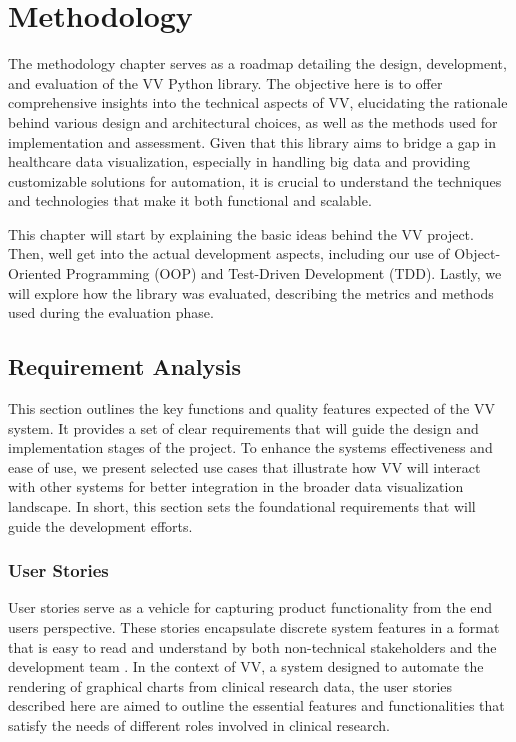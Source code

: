 \chapter{Methodology}\label{methodology}

\minitoc

The methodology chapter serves as a roadmap detailing the design,
development, and evaluation of the VV Python library. The objective here
is to offer comprehensive insights into the technical aspects of VV,
elucidating the rationale behind various design and architectural
choices, as well as the methods used for implementation and assessment.
Given that this library aims to bridge a gap in healthcare data
visualization, especially in handling big data and providing
customizable solutions for automation, it is crucial to understand the
techniques and technologies that make it both functional and scalable.

This chapter will start by explaining the basic ideas behind the VV
project. Then, we\textquotesingle ll get into the actual development
aspects, including our use of Object-Oriented Programming (OOP) and
Test-Driven Development (TDD). Lastly, we will explore how the library
was evaluated, describing the metrics and methods used during the
evaluation phase.

\section{Requirement Analysis}\label{requirement-analysis}

This section outlines the key functions and quality features expected of
the VV system. It provides a set of clear requirements that will guide
the design and implementation stages of the project. To enhance the
system\textquotesingle s effectiveness and ease of use, we present
selected use cases that illustrate how VV will interact with other
systems for better integration in the broader data visualization
landscape. In short, this section sets the foundational requirements
that will guide the development efforts.

\subsection{User Stories}\label{user-stories}

User stories serve as a vehicle for capturing product functionality from
the end user\textquotesingle s perspective. These stories encapsulate
discrete system features in a format that is easy to read and understand
by both non-technical stakeholders and the development team
\cite{37}\cite{38}. In the
context of VV, a system designed to automate the rendering of graphical
charts from clinical research data, the user stories described here are
aimed to outline the essential features and functionalities that satisfy
the needs of different roles involved in clinical research.

